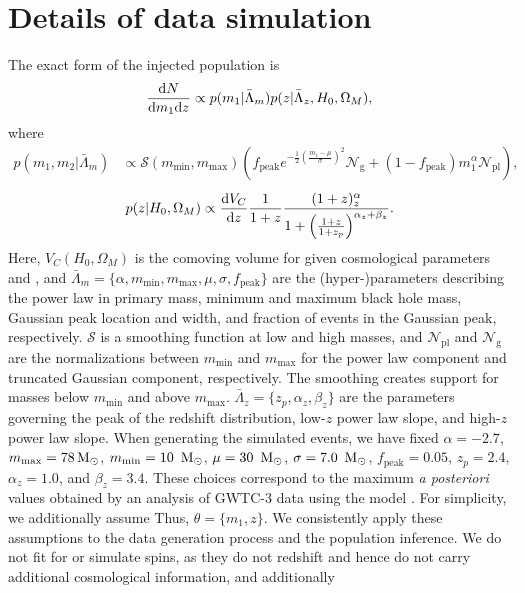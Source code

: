 \documentclass[preprint2,linenumbers]{aastex631}
\begin{document}
\section{Details of data simulation}
\label{ap:data generation}
The exact form of the injected population is
\begin{equation}
\label{eq:underlying population}
    \frac{\diff N}{\diff m_1 \diff z} \propto p(m_1|\bar{\Lambda}_m) p(z|\bar{\Lambda}_z, H_0, \Omega_M),
\end{equation}
where 
\begin{align}
    p(m_1,m_2|\bar{\Lambda}_m) &\propto \mathcal{S}(m_{\min},m_{\max})
    \left( f_{\text{peak}}e^{-\frac{1}{2}(\frac{m_1-\mu}{\sigma})^2}\mathcal{N}_{\text{g}} +
    (1-f_{\text{peak}})m_1^{\alpha}\mathcal{N}_{\text{pl}} \right) ,
\label{eq:underlying mass dist}
\end{align}
\begin{equation}
    p(z|H_0, \Omega_M) \propto \frac{\diff V_C}{\diff z} \frac{1}{1+z} \frac{(1+z)^\alpha_z}{1+\left(\frac{1+z}{1+z_p}\right)^{\alpha_z+\beta_z}}.
    \label{eq:underlying redshift dist}
\end{equation}
Here, $V_C(H_0, \Omega_M)$ is the comoving volume for given cosmological parameters \Ho{} and \Omm{}, and $\bar{\Lambda}_m = \{\alpha, m_{\min}, m_{\max}, \mu, \sigma, f_{\text{peak}}\}$ are the (hyper-)parameters describing the power law in primary mass, minimum and maximum black hole mass, Gaussian peak location and width, and fraction of events in the Gaussian peak, respectively.
$\mathcal{S}$ is a smoothing function at low and high masses, and $\mathcal{N}_{\text{pl}}$ and $\mathcal{N}_{\text{g}}$ are the normalizations between  $m_{\min}$ and $m_{\max}$ for the power law component and truncated Gaussian component, respectively.
The smoothing creates support for masses below $m_{\min}$ and above $m_{\max}$.
$\bar{\Lambda}_z = \{z_p,\alpha_z,\beta_z\}$ are the parameters governing the peak of the redshift distribution, low-$z$ power law slope, and high-$z$ power law slope.
When generating the simulated events, we have fixed $\alpha=-2.7$, $m_{\max}=78\,\text{M}_{\odot}$, $m_{\min}=10~\,\text{M}_{\odot}$, $\mu=30~\,\text{M}_{\odot}$, $\sigma=7.0~\,\text{M}_{\odot}$, $f_{\text{peak}}=0.05$, $z_p=2.4$, $\alpha_z=1.0$, and $\beta_z=3.4$.
These choices correspond to the maximum \emph{a posteriori} values obtained by an analysis of GWTC-3 data using the \plp{} model \citep{abbott_population_2023}.
For simplicity, we additionally assume 
Thus, $\theta = \{m_1,z\}$.
We consistently apply these assumptions to the data generation process and the population inference.
We do not fit for or simulate spins, as they do not redshift and hence do not carry additional cosmological information, and additionally 
\end{document}

